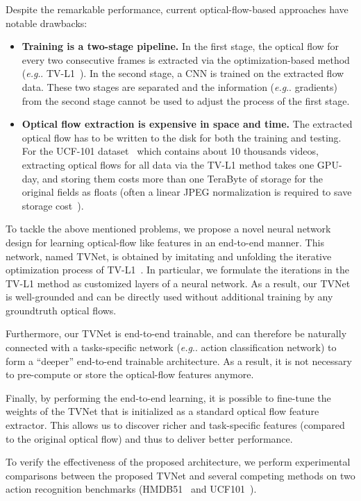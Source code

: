 \documentclass[10pt,twocolumn,letterpaper]{article}
\makeatletter
\DeclareRobustCommand\onedot{\futurelet\@let@token\@onedot}
\def\@onedot{\ifx\@let@token.\else.\null\fi\xspace}
\def\eg{\emph{e.g}\onedot} \def\Eg{\emph{E.g}\onedot}
\makeatother
\begin{document}
Despite the remarkable performance, current optical-flow-based approaches have notable drawbacks:
\begin{itemize}
  \item \textbf{Training is a two-stage pipeline.} In the first stage, the optical flow for every two consecutive frames is extracted via the optimization-based method (\eg TV-L1~\cite{zach2007duality}). In the second stage, a CNN is trained on the extracted flow data. These two stages are separated and the information (\eg gradients) from the second stage cannot be used to adjust the process of the first stage.
  \item \textbf{Optical flow extraction is expensive in space and time.} The extracted optical flow has to be written to the disk for both the training and testing. For the UCF-101 dataset~\cite{soomro2012ucf101} which contains about 10 thousands videos, extracting optical flows for all data via the TV-L1 method  takes one GPU-day, and storing them costs more than one TeraByte of storage for the original fields as floats (often a linear JPEG normalization is required to save storage cost~\cite{Simonyan_NIPS14}).
\end{itemize}






To tackle the above mentioned problems, we propose a novel neural network design for learning optical-flow like features in an end-to-end manner. This network, named TVNet, is obtained by imitating and unfolding the iterative optimization process of TV-L1~\cite{zach2007duality}. In particular, we formulate the iterations in the TV-L1 method as customized layers of a neural network. As a result, our TVNet is well-grounded and can be directly used without additional training by any groundtruth optical flows.


Furthermore, our TVNet is end-to-end trainable, and can therefore
be naturally connected with a tasks-specific network (\eg action classification network) to form a ``deeper'' end-to-end trainable architecture. As a result, it is not necessary to pre-compute or store the optical-flow features anymore.


Finally, by performing the end-to-end learning, it is possible to
fine-tune the weights of the TVNet that is initialized as a standard optical flow feature extractor. This allows us to discover richer and task-specific features (compared to the original optical flow) and thus to deliver better performance.

To verify the effectiveness of the proposed architecture, we perform experimental comparisons between the proposed TVNet and several competing methods on two action recognition benchmarks (HMDB51~\cite{kuehne2011hmdb} and UCF101~\cite{soomro2012ucf101}).
\end{document}
